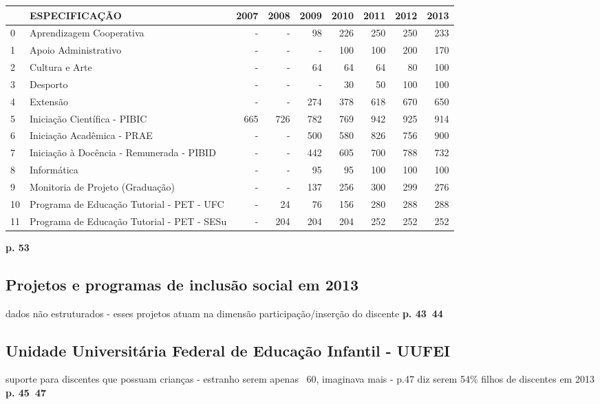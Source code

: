 \documentclass{report}
\begin{document}
\begin{tabular}{llrrrrrrr}
\toprule
{} &                               ESPECIFICAÇÃO &  2007 &  2008 &  2009 &  2010 &  2011 &  2012 &  2013 \\
\midrule
0  &                    Aprendizagem Cooperativa &     - &     - &    98 &   226 &   250 &   250 &   233 \\
1  &                        Apoio Administrativo &     - &     - &     - &   100 &   100 &   200 &   170 \\
2  &                              Cultura e Arte &     - &     - &    64 &    64 &    64 &    80 &   100 \\
3  &                                    Desporto &     - &     - &     - &    30 &    50 &   100 &   100 \\
4  &                                    Extensão &     - &     - &   274 &   378 &   618 &   670 &   650 \\
5  &                Iniciação Científica - PIBIC &   665 &   726 &   782 &   769 &   942 &   925 &   914 \\
6  &                  Iniciação Acadêmica - PRAE &     - &     - &   500 &   580 &   826 &   756 &   900 \\
7  &   Iniciação à Docência - Remunerada - PIBID &     - &     - &   442 &   605 &   700 &   788 &   732 \\
8  &                                 Informática &     - &     - &    95 &    95 &   100 &   100 &   100 \\
9  &            Monitoria de Projeto (Graduação) &     - &     - &   137 &   256 &   300 &   299 &   276 \\
10 &   Programa de Educação Tutorial - PET - UFC &     - &    24 &    76 &   156 &   280 &   288 &   288 \\
11 &  Programa de Educação Tutorial - PET - SESu &     - &   204 &   204 &   204 &   252 &   252 &   252 \\
\bottomrule
\end{tabular}

\textbf{p. 53}

\subsection{Projetos e programas de inclusão social em 2013}
dados não estruturados - esses projetos atuam na dimensão participação/inserção do discente
\textbf{p. 43~44}

\subsection{Unidade Universitária Federal de Educação Infantil - UUFEI}
suporte para discentes que possuam crianças - estranho serem apenas ~60, imaginava mais - p.47 diz serem 54\% filhos de discentes em 2013
\textbf{p. 45~47}
\end{document}
